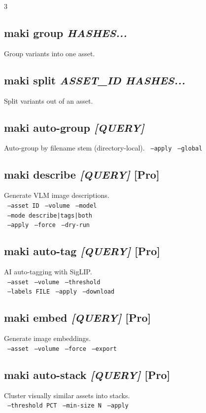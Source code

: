 \documentclass[a4paper,landscape,8pt]{article}
\newcommand{\opt}[1]{\texttt{\scriptsize\color{maki-stone} #1}}
\newcommand{\pro}{\textcolor{maki-teal}{\scriptsize [Pro]}}
\begin{document}
\begin{multicols}{3}
\subsection{maki group \textit{HASHES...}}
Group variants into one asset.

\subsection{maki split \textit{ASSET\_ID HASHES...}}
Split variants out of an asset.

\subsection{maki auto-group \textit{[QUERY]}}
Auto-group by filename stem (directory-local). \opt{--apply} \opt{--global}

\subsection{maki describe \textit{[QUERY]} \pro}
Generate VLM image descriptions. \\
\opt{--asset ID} \opt{--volume} \opt{--model} \\
\opt{--mode describe|tags|both} \\
\opt{--apply} \opt{--force} \opt{--dry-run}

\subsection{maki auto-tag \textit{[QUERY]} \pro}
AI auto-tagging with SigLIP. \\
\opt{--asset} \opt{--volume} \opt{--threshold} \\
\opt{--labels FILE} \opt{--apply} \opt{--download}

\subsection{maki embed \textit{[QUERY]} \pro}
Generate image embeddings. \\
\opt{--asset} \opt{--volume} \opt{--force} \opt{--export}

\subsection{maki auto-stack \textit{[QUERY]} \pro}
Cluster visually similar assets into stacks. \\
\opt{--threshold PCT} \opt{--min-size N} \opt{--apply}


\end{multicols}
\end{document}
